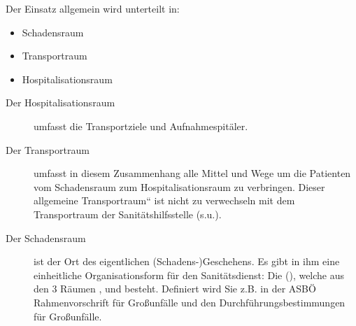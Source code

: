 Der Einsatz allgemein wird unterteilt in: 

\begin{itemize}
  \item Schadensraum
  \item Transportraum
  \item Hospitalisationsraum
\end{itemize}

\begin{description}
  \item[Der Hospitalisationsraum] umfasst die Transportziele und
  Aufnahmespitäler.
  \item[Der Transportraum] umfasst in diesem Zusammenhang alle Mittel und Wege um
  die Patienten vom Schadens\-raum zum Hospitalisationsraum zu
  verbringen. Dieser {\quotedblbase}allgemeine
  Transportraum{\textquotedblleft} ist nicht zu ver\-wechseln mit dem
  Transportraum der Sanitätshilfsstelle (s.u.).
  \item[Der Schadensraum] ist der Ort des eigentlichen (Schadens-)Geschehens. Es
  gibt in ihm eine einheitliche Organisations\-form für den
  Sanitätsdienst: Die  (), welche aus den
  3 Räumen ,  und  besteht.
  Definiert wird Sie z.B. in der ASB\"O Rahmen\-vor\-schrift für
  Großunfälle und den Durchführungsbestimmungen für
  Großunfälle.
\end{description}



 



